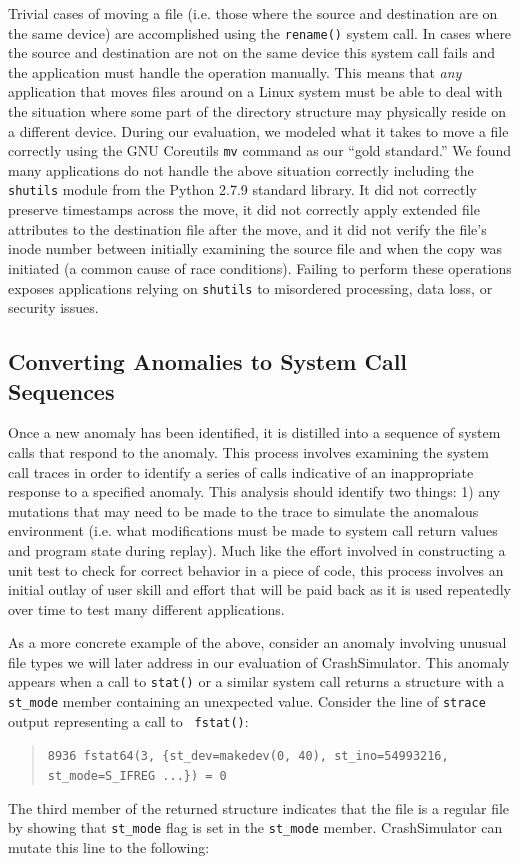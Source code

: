 Trivial cases of moving a file (i.e. those where the source and destination
are on the same device) are accomplished using the {\tt rename()} system
call.  In cases where the source and destination are not on the same device
this system call fails and the application must handle the operation
manually. This means that \emph{any} application that moves files around on
a Linux system must be able to deal with the situation where some part of
the directory structure may physically reside on a different device.
During our evaluation, we modeled what it takes to move a file correctly
using the GNU Coreutils {\tt mv} command as our ``gold standard.''  We
found many applications do not handle the above situation correctly
including the {\tt shutils} module from the Python 2.7.9 standard library.
It did not correctly preserve timestamps across the move, it did not
correctly apply extended file attributes to the destination file after the
move, and it did not verify the file's inode number between initially
examining the source file and when the copy was initiated (a common cause
of race conditions).  Failing to perform these operations exposes
applications relying on {\tt shutils} to misordered processing, data loss,
or security issues.

\subsection{Converting Anomalies to System Call Sequences}

Once a new anomaly has been identified, it is distilled into a sequence of
system calls that respond to the anomaly.  This process involves examining
the system call traces in order to identify a series of calls indicative of
an inappropriate response to a specified anomaly.  This analysis should
identify two things: 1) any mutations that may need to be made to the trace
to simulate the anomalous environment (i.e. what modifications must be made
to system call return values and program state during replay).  Much like
the effort involved in constructing a unit test to check for correct
behavior in a piece of code, this process involves an initial outlay of
user skill and effort that will be paid back as it is used repeatedly over
time to test many different applications.

As a more concrete example of the above, consider an anomaly
involving unusual file types we will later address in our evaluation of
CrashSimulator.  This anomaly appears when a call to {\tt stat()} or a similar system
call returns a structure with a {\tt st\_mode} member containing an unexpected
value. Consider the line of {\tt strace} output representing a call to {\tt
  fstat()}:
\begin{quote}
  {\tt 8936  fstat64(3, \{st\_dev=makedev(0, 40), st\_ino=54993216, st\_mode=S\_IFREG ...\}) = 0}
\end{quote}
The third member of the returned structure indicates that the file is a
regular file by showing that {\tt st\_mode} flag is set in the {\tt st\_mode}
member.  CrashSimulator can mutate this  line to the following:

